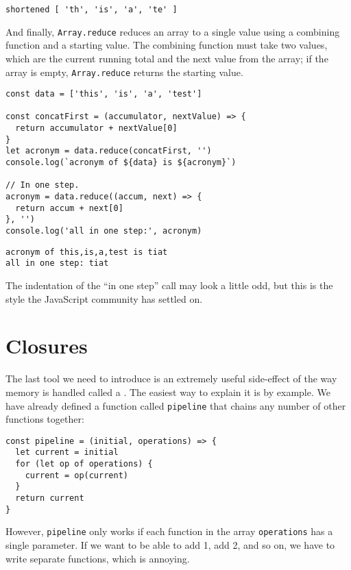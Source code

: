 \begin{verbatim}
shortened [ 'th', 'is', 'a', 'te' ]
\end{verbatim}

And finally,
\texttt{Array.reduce} reduces an array to a single value
using a combining function and a starting value.
The combining function must take two values,
which are the current running total and the next value from the array;
if the array is empty,
\texttt{Array.reduce} returns the starting value.

\begin{verbatim}
const data = ['this', 'is', 'a', 'test']

const concatFirst = (accumulator, nextValue) => {
  return accumulator + nextValue[0]
}
let acronym = data.reduce(concatFirst, '')
console.log(`acronym of ${data} is ${acronym}`)

// In one step.
acronym = data.reduce((accum, next) => {
  return accum + next[0]
}, '')
console.log('all in one step:', acronym)
\end{verbatim}

\begin{verbatim}
acronym of this,is,a,test is tiat
all in one step: tiat
\end{verbatim}

The indentation of the ``in one step'' call may look a little odd,
but this is the style the JavaScript community has settled on.

\section{Closures}\label{s:callbacks-closures}

The last tool we need to introduce is an extremely useful side-effect of the way memory is handled
called a .
The easiest way to explain it is by example.
We have already defined a function called \texttt{pipeline} that chains any number of other functions together:

\begin{verbatim}
const pipeline = (initial, operations) => {
  let current = initial
  for (let op of operations) {
    current = op(current)
  }
  return current
}
\end{verbatim}

However,
\texttt{pipeline} only works if each function in the array \texttt{operations} has a single parameter.
If we want to be able to add 1,
add 2,
and so on,
we have to write separate functions,
which is annoying.


